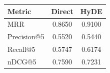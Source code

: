 \begin{tabular}{lcc}
\hline
Metric & Direct & HyDE \\
\hline
MRR & 0.8650 & 0.9100 \\
Precision@5 & 0.5520 & 0.5440 \\
Recall@5 & 0.5747 & 0.6174 \\
nDCG@5 & 0.7590 & 0.7231 \\
\hline
\end{tabular}

